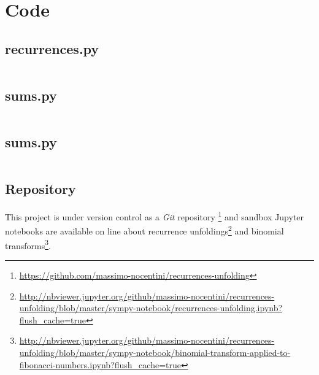 
\chapter{Code}

\section{recurrences.py}
\begin{adjustwidth}{-4cm}{0cm}
    \inputminted{python}{../sympy-notebook/recurrences.py}
\end{adjustwidth}

\section{sums.py}

\begin{adjustwidth}{-4cm}{0cm}
    \inputminted{python}{../sympy-notebook/sums.py}
\end{adjustwidth}

\section{sums.py}

\begin{adjustwidth}{-4cm}{0cm}
    \inputminted{python}{../sympy-notebook/doubly-indexed-recurrences.py}
\end{adjustwidth}

\section{Repository}

This project is under version control as a \emph{Git} repository
\footnote{\url{https://github.com/massimo-nocentini/recurrences-unfolding}}
and sandbox Jupyter notebooks are available on line about recurrence
unfoldings\footnote{\url{http://nbviewer.jupyter.org/github/massimo-nocentini/recurrences-unfolding/blob/master/sympy-notebook/recurrences-unfolding.ipynb?flush_cache=true}} 
and binomial transforms\footnote{\url{http://nbviewer.jupyter.org/github/massimo-nocentini/recurrences-unfolding/blob/master/sympy-notebook/binomial-transform-applied-to-fibonacci-numbers.ipynb?flush_cache=true}}.

